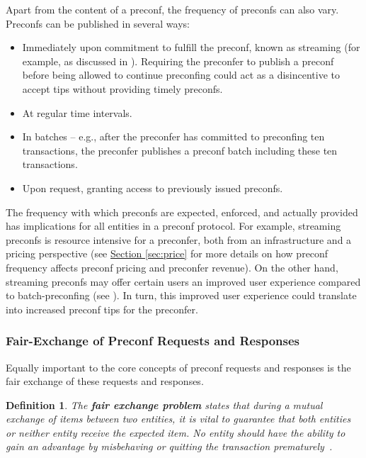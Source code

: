 \documentclass[a4paper]{article}
\theoremstyle{boldstyle}
\newtheorem{definitionx}{Definition}
\newenvironment{definition}
  {\begin{defopenboxq}\begin{definitionx}}
  {\end{definitionx}\end{defopenboxq}}
\begin{document}
    Apart from the content of a preconf, the frequency of preconfs can also vary. Preconfs can be published in several ways:
    \begin{itemize}
        \item Immediately upon commitment to fulfill the preconf, known as streaming (for example, as discussed in \cite{W:ThePreconfirmationGatewayUnlockingPreconfirmations:FromUsertoPreconfer}). Requiring the preconfer to publish a preconf before being allowed to continue preconfing could act as a disincentive to accept tips without providing timely preconfs. 
        
        \item At regular time intervals.
        \item In batches -- e.g., after the preconfer has committed to preconfing ten transactions, the preconfer publishes a preconf batch including these ten transactions.
        \item Upon request, granting access to previously issued preconfs.
    \end{itemize}

    The frequency with which preconfs are expected, enforced, and actually provided has implications for all entities in a preconf protocol. For example, streaming preconfs is resource intensive for a preconfer, both from an infrastructure and a pricing perspective (see \hyperref[sec:price]{Section \ref{sec:price}} for more details on how preconf frequency affects preconf pricing and preconfer revenue). On the other hand, streaming preconfs may offer certain users an improved user experience compared to batch-preconfing (see \cite{W:ThePreconfirmationGatewayUnlockingPreconfirmations:FromUsertoPreconfer}). In turn, this improved user experience could translate into increased preconf tips for the preconfer. 
    

\subsubsection{Fair-Exchange of Preconf Requests and Responses} \label{fair_exchange_problem}
    Equally important to the core concepts of preconf requests and responses is the fair exchange of these requests and responses. 
    \begin{definition}
        
    The \textbf{fair exchange problem} states that during a mutual exchange of items between two entities, it is vital to guarantee that both entities or neither entity receive the expected item. No entity should have the ability to gain an advantage by misbehaving or quitting the transaction prematurely~\cite{P:Fairexchangewithasemi-trustedthirdparty,T:Fairnessinelectroniccommerce}.
    \end{definition}
\end{document}
